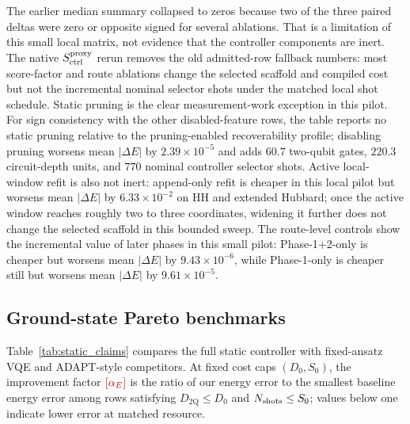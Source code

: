 \documentclass[
  reprint,
  amsmath,
  amssymb,
  aps,
  pra,
  nofootinbib,
  superscriptaddress,
  floatfix
]{revtex4-2}
\newcommand{\placeholder}[1]{\textcolor{red!70!black}{\ifmmode\left[#1\right]\else\textsf{[#1]}\fi}}
\newcommand{\twq}{\mathrm{2Q}}
\begin{document}
The earlier median summary collapsed to zeros because two of the three paired deltas were zero or opposite signed for several ablations. That is a limitation of this small local matrix, not evidence that the controller components are inert. The native $S_{\rm ctrl}^{\rm proxy}$ rerun removes the old admitted-row fallback numbers: most score-factor and route ablations change the selected scaffold and compiled cost but not the incremental nominal selector shots under the matched local shot schedule. Static pruning is the clear measurement-work exception in this pilot. For sign consistency with the other disabled-feature rows, the table reports no static pruning relative to the pruning-enabled recoverability profile; disabling pruning worsens mean $|\Delta E|$ by $2.39\!\times\!10^{-5}$ and adds $60.7$ two-qubit gates, $220.3$ circuit-depth units, and $770$ nominal controller selector shots. Active local-window refit is also not inert: append-only refit is cheaper in this local pilot but worsens mean $|\Delta E|$ by $6.33\!\times\!10^{-2}$ on HH and extended Hubbard; once the active window reaches roughly two to three coordinates, widening it further does not change the selected scaffold in this bounded sweep. The route-level controls show the incremental value of later phases in this small pilot: Phase-1+2-only is cheaper but worsens mean $|\Delta E|$ by $9.43\!\times\!10^{-6}$, while Phase-1-only is cheaper still but worsens mean $|\Delta E|$ by $9.61\!\times\!10^{-5}$.

\endgroup

\subsection{Ground-state Pareto benchmarks}

Table~\ref{tab:static_claims} compares the full static controller with fixed-ansatz VQE and ADAPT-style competitors. At fixed cost caps $(D_0,S_0)$, the improvement factor $\placeholder{\alpha_E}$ is the ratio of our energy error to the smallest baseline energy error among rows satisfying $D_{\twq}\le D_0$ and $N_{\rm shots}\le S_0$; values below one indicate lower error at matched resource.
\end{document}
